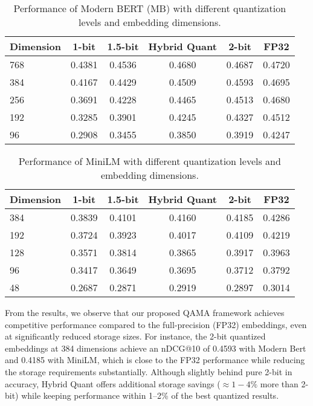 \begin{table}[ht]
\caption{Performance of Modern BERT (MB) with different quantization levels and embedding dimensions.}
\label{tab:mb_main_results}
\centering
\begin{tabular}{lccccc}
\toprule
\textbf{Dimension} & \textbf{1-bit} & \textbf{1.5-bit} & \textbf{Hybrid Quant} & \textbf{2-bit} & \textbf{FP32} \\
\midrule
768 & 0.4381 & 0.4536 & 0.4680 & 0.4687 & 0.4720 \\
384 & 0.4167 & 0.4429 & 0.4509 & 0.4593 & 0.4695 \\
256 & 0.3691 & 0.4228 & 0.4465 & 0.4513 & 0.4680 \\
192 & 0.3285 & 0.3901 & 0.4245 & 0.4327 & 0.4512 \\
96 & 0.2908 & 0.3455 & 0.3850 & 0.3919 & 0.4247 \\
\bottomrule
\end{tabular}
\end{table}

\begin{table}[ht]
\caption{Performance of MiniLM with different quantization levels and embedding dimensions.}
\label{tab:minilm_main_results}
\centering
\begin{tabular}{lccccc}
\toprule
\textbf{Dimension} & \textbf{1-bit} & \textbf{1.5-bit} & \textbf{Hybrid Quant} & \textbf{2-bit} & \textbf{FP32} \\
\midrule
384 & 0.3839 & 0.4101 & 0.4160 & 0.4185 & 0.4286 \\
192 & 0.3724 & 0.3923 & 0.4017 & 0.4109 & 0.4219 \\
128 & 0.3571 & 0.3814 & 0.3865 & 0.3917 & 0.3963 \\
96 & 0.3417 & 0.3649 & 0.3695 & 0.3712 & 0.3792 \\
48 & 0.2687 & 0.2871 & 0.2919 & 0.2897 & 0.3014 \\
\bottomrule
\end{tabular}
\end{table}

From the results, we observe that our proposed QAMA framework achieves competitive performance compared to the full-precision (FP32) embeddings, even at significantly reduced storage sizes. 
For instance, the 2-bit quantized embeddings at 384 dimensions achieve an nDCG@10 of 0.4593 with Modern Bert and 0.4185 with MiniLM, which is close to the FP32 performance while reducing the storage requirements substantially.
Although slightly behind pure 2-bit in accuracy, Hybrid Quant offers additional storage savings (\(\approx 1{-}4\%\) more than 2-bit) while keeping performance within 1--2\% of the best quantized results. 


